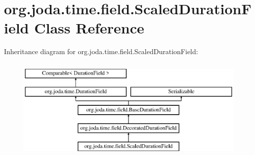 \hypertarget{classorg_1_1joda_1_1time_1_1field_1_1_scaled_duration_field}{\section{org.\-joda.\-time.\-field.\-Scaled\-Duration\-Field Class Reference}
\label{classorg_1_1joda_1_1time_1_1field_1_1_scaled_duration_field}
}
Inheritance diagram for org.\-joda.\-time.\-field.\-Scaled\-Duration\-Field\-:\begin{figure}[H]
\begin{center}
\leavevmode
\includegraphics[height=5.000000cm]{classorg_1_1joda_1_1time_1_1field_1_1_scaled_duration_field}
\end{center}
\end{figure}
